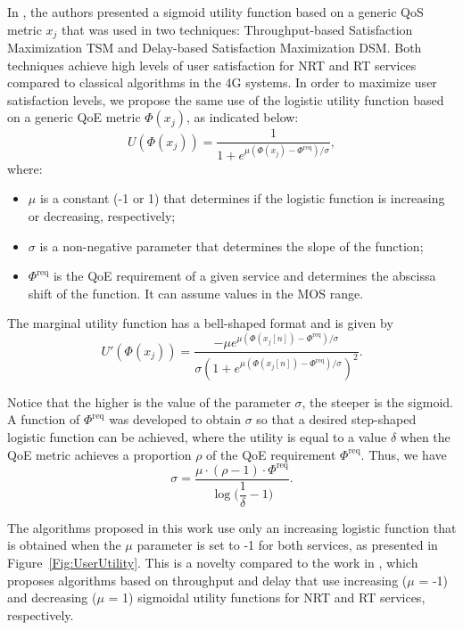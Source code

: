 \documentclass[conference]{IEEEtran}
\newcommand{\FigRef}[1]{Figure~\ref{#1}}
\begin{document}
In \cite{Rodrigues2014_Wiley}, the authors presented a sigmoid utility function based on a generic \ac{QoS} metric $x_j$ that was used in two techniques: Throughput-based Satisfaction Maximization \ac{TSM} and Delay-based Satisfaction Maximization \ac{DSM}. Both techniques achieve high levels of user satisfaction for \ac{NRT} and \ac{RT} services compared to classical algorithms in the \ac{4G} systems. In order to maximize user satisfaction levels, we propose the same use of the logistic utility function based on a generic \ac{QoE} metric $\Phi(x_j)$, as indicated below:
%	
\begin{equation}
U\left(\Phi(x_j)\right) = \dfrac{1}{1 + e^{\mu (\Phi(x_j) - \Phi^{\mathrm{req}}) / \sigma}},
\label{Eq:TSMQoESigmoid}
\end{equation}
%
where:
\begin{itemize} 
	\item $\mu$ is a constant (-1 or 1) that determines if the logistic function is increasing or decreasing, respectively;
	\item $\sigma$ is a non-negative parameter that determines the slope of the function; 
	\item $\Phi^{\text{req}}$ is the \ac{QoE} requirement of a given service and determines the abscissa shift of the function. It can assume values in the \ac{MOS} range.
\end{itemize}

The marginal utility function has a bell-shaped format and is given by
%
\begin{equation}
\label{Eq:wQoE}
U'\left(\Phi\left(x_j\right)\right)=\dfrac{- \mu  e^{\mu (\Phi(x_{j}[n]) - \Phi^{\text{req}}) / \sigma}}{\sigma (1 + e^{\mu (\Phi(x_{j}[n]) - \Phi^{\text{req}}) / \sigma})^{2}}.
\end{equation}

Notice that the higher is the value of the parameter $\sigma$, the steeper is the sigmoid. A function of $ \Phi^{\mathrm{req}}$ was developed to obtain $\sigma$ so that a desired step-shaped logistic function can be achieved, where the utility is equal to a value $\delta$ when the QoE metric achieves a proportion $\rho$ of the QoE requirement $\Phi^{\text{req}}$. Thus, we have
%
\begin{equation}
\label{Eq:Sigma}
\sigma = \dfrac{\mu \cdot (\rho - 1) \cdot \Phi^{\text{req}}}{\log \Big( \dfrac{1}{\delta} - 1\Big)}.
\end{equation}

The algorithms proposed in this work use only an increasing logistic function that is obtained when the $\mu$ parameter is set to -1 for both services, as presented in \FigRef{Fig:UserUtility}. This is a novelty compared to the work in \cite{Rodrigues2014_Wiley}, which proposes algorithms based on throughput and delay that use increasing ($\mu$ = -1) and decreasing ($\mu$ = 1) sigmoidal utility functions for \ac{NRT} and \ac{RT} services, respectively.
\end{document}
